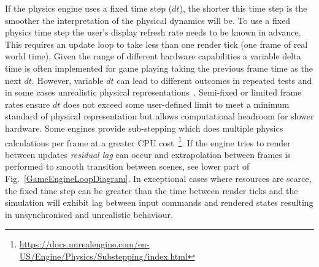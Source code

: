 \documentclass[letterpaper, 10 pt, journal, twoside]{IEEEtran}
\begin{document}
If the physics engine uses a fixed time step ($dt$), %
the shorter this time step is the smoother the interpretation of the physical dynamics will be. %
%
To use a fixed physics time step the user's display refresh rate needs to be known in advance. This requires an update loop to take less than one render tick (one frame of real world time). Given the range of different hardware capabilities a variable delta time is often implemented for game playing taking the previous frame time as the next $dt$. However, variable $dt$ can lead to different outcomes in repeated tests and in some cases unrealistic physical representations~\cite{gaffer}. Semi-fixed or limited frame rates ensure $dt$ does not exceed some user-defined limit to meet a minimum standard of physical representation but allows computational headroom for slower hardware. Some engines provide sub-stepping which does multiple physics calculations per frame at a greater CPU cost~\footnote{\url{https://docs.unrealengine.com/en-US/Engine/Physics/Substepping/index.html}}. If the engine tries to render between updates \textit{residual lag} can occur and extrapolation between frames is performed to smooth transition between scenes, see lower part of Fig.~\ref{GameEngineLoopDiagram}. %
%
In exceptional cases where resources are scarce, the fixed time step can be greater than the time between render ticks %
and the simulation will exhibit lag between input commands and rendered states resulting in unsynchronised and unrealistic behaviour.


\end{document}
